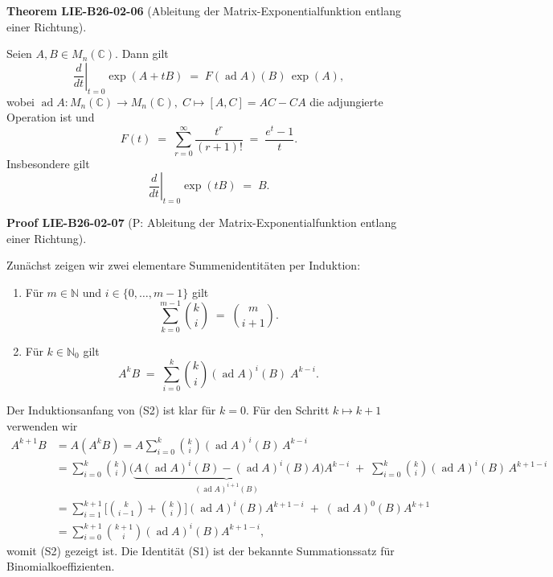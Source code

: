 \documentclass[10pt, letterpaper]{article}
\newcommand{\CustomHeading}[3]{%
  \par\medskip\noindent%
  \textbf{#1 #2} \textnormal{(#3)}.\enskip%
}
\newenvironment{THEO}[2]{\begin{unitbox}\CustomHeading{Theorem}{#1}{#2}}{\end{unitbox}}
\newenvironment{PROOF}[2]{\begin{unitbox}\CustomHeading{Proof}{#1}{#2}}{\end{unitbox}}
\begin{document}
\begin{THEO}{LIE-B26-02-06}{Ableitung der Matrix-Exponentialfunktion entlang einer Richtung}
Seien $A,B \in M_{n}(\mathbb{C})$. Dann gilt
\[
\left.\frac{d}{dt}\right|_{t=0} \exp(A+tB)
 \;=\; F(\operatorname{ad}A)(B)\,\exp(A),
\]
wobei $\operatorname{ad}A : M_n(\mathbb{C}) \to M_n(\mathbb{C}),\; C \mapsto [A,C]=AC-CA$ 
die adjungierte Operation ist und
\[
F(t) \;=\; \sum_{r=0}^{\infty} \frac{t^{r}}{(r+1)!} \;=\; \frac{e^{t}-1}{t}.
\]
Insbesondere gilt
\[
\left.\frac{d}{dt}\right|_{t=0} \exp(tB) \;=\; B.
\]
\end{THEO}



\begin{PROOF}{LIE-B26-02-07}{P: Ableitung der Matrix-Exponentialfunktion entlang einer Richtung}
Zunächst zeigen wir zwei elementare Summenidentitäten per Induktion:
\begin{enumerate}\itemsep0.2em
\item[(S1)] Für $m\in\mathbb{N}$ und $i\in\{0,\dots,m-1\}$ gilt 
\[
\sum_{k=0}^{m-1} \binom{k}{i} \;=\; \binom{m}{i+1}.
\]
\item[(S2)] Für $k\in\mathbb{N}_0$ gilt
\[
A^{k}B \;=\; \sum_{i=0}^{k} \binom{k}{i} (\operatorname{ad}A)^{i}(B)\; A^{k-i}.
\]
\end{enumerate}
Der Induktionsanfang von (S2) ist klar für $k=0$. Für den Schritt $k\mapsto k+1$ verwenden wir
\[
\begin{aligned}
A^{k+1}B &= A(A^{k}B)
= A \sum_{i=0}^{k} \binom{k}{i} (\operatorname{ad}A)^{i}(B)\,A^{k-i}\\
&=\sum_{i=0}^{k} \binom{k}{i} 
\Big( \underbrace{A(\operatorname{ad}A)^{i}(B) - (\operatorname{ad}A)^{i}(B)A}_{(\operatorname{ad}A)^{i+1}(B)} \Big) A^{k-i}
\;+\; \sum_{i=0}^{k} \binom{k}{i} (\operatorname{ad}A)^{i}(B)\,A^{k+1-i}\\
&=\sum_{i=1}^{k+1} \bigg[ \binom{k}{i-1} + \binom{k}{i} \bigg] (\operatorname{ad}A)^{i}(B) A^{k+1-i} \;+\; (\operatorname{ad}A)^{0}(B)A^{k+1}\\
&=\sum_{i=0}^{k+1} \binom{k+1}{i} (\operatorname{ad}A)^{i}(B) A^{k+1-i},
\end{aligned}
\]
womit (S2) gezeigt ist. Die Identität (S1) ist der bekannte Summationssatz für Binomialkoeffizienten.


\end{PROOF}
\end{document}
